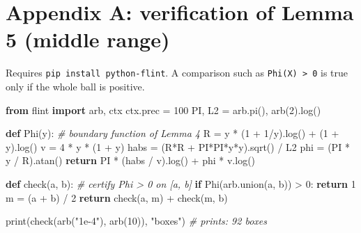 \documentclass[
  11pt,
]{article}
\newenvironment{Shaded}{}{}
\newcommand{\BuiltInTok}[1]{\textcolor[rgb]{0.00,0.50,0.00}{#1}}
\newcommand{\CommentTok}[1]{\textcolor[rgb]{0.38,0.63,0.69}{\textit{#1}}}
\newcommand{\ControlFlowTok}[1]{\textcolor[rgb]{0.00,0.44,0.13}{\textbf{#1}}}
\newcommand{\DecValTok}[1]{\textcolor[rgb]{0.25,0.63,0.44}{#1}}
\newcommand{\ImportTok}[1]{\textcolor[rgb]{0.00,0.50,0.00}{\textbf{#1}}}
\newcommand{\KeywordTok}[1]{\textcolor[rgb]{0.00,0.44,0.13}{\textbf{#1}}}
\newcommand{\NormalTok}[1]{#1}
\newcommand{\OperatorTok}[1]{\textcolor[rgb]{0.40,0.40,0.40}{#1}}
\newcommand{\StringTok}[1]{\textcolor[rgb]{0.25,0.44,0.63}{#1}}
\begin{document}
\hypertarget{appendix-a-verification-of-lemma-5-middle-range}{%
\section*{Appendix A: verification of Lemma 5 (middle
range)}\label{appendix-a-verification-of-lemma-5-middle-range}}

Requires \texttt{pip\ install\ python-flint}. A comparison such as
\texttt{Phi(X)\ \textgreater{}\ 0} is true only if the whole ball is
positive.

\begin{Shaded}
\begin{Highlighting}[]
\ImportTok{from}\NormalTok{ flint }\ImportTok{import}\NormalTok{ arb, ctx}
\NormalTok{ctx.prec }\OperatorTok{=} \DecValTok{100}
\NormalTok{PI, L2 }\OperatorTok{=}\NormalTok{ arb.pi(), arb(}\DecValTok{2}\NormalTok{).log()}

\KeywordTok{def}\NormalTok{ Phi(y):                     }\CommentTok{\# boundary function of Lemma 4}
\NormalTok{    R }\OperatorTok{=}\NormalTok{ y }\OperatorTok{*}\NormalTok{ (}\DecValTok{1} \OperatorTok{+} \DecValTok{1}\OperatorTok{/}\NormalTok{y).log() }\OperatorTok{+}\NormalTok{ (}\DecValTok{1} \OperatorTok{+}\NormalTok{ y).log()}
\NormalTok{    v }\OperatorTok{=} \DecValTok{4} \OperatorTok{*}\NormalTok{ y }\OperatorTok{*}\NormalTok{ (}\DecValTok{1} \OperatorTok{+}\NormalTok{ y)}
\NormalTok{    habs }\OperatorTok{=}\NormalTok{ (R}\OperatorTok{*}\NormalTok{R }\OperatorTok{+}\NormalTok{ PI}\OperatorTok{*}\NormalTok{PI}\OperatorTok{*}\NormalTok{y}\OperatorTok{*}\NormalTok{y).sqrt() }\OperatorTok{/}\NormalTok{ L2}
\NormalTok{    phi }\OperatorTok{=}\NormalTok{ (PI }\OperatorTok{*}\NormalTok{ y }\OperatorTok{/}\NormalTok{ R).atan()}
    \ControlFlowTok{return}\NormalTok{ PI }\OperatorTok{*}\NormalTok{ (habs }\OperatorTok{/}\NormalTok{ v).log() }\OperatorTok{+}\NormalTok{ phi }\OperatorTok{*}\NormalTok{ v.log()}

\KeywordTok{def}\NormalTok{ check(a, b):                }\CommentTok{\# certify Phi \textgreater{} 0 on [a, b]}
    \ControlFlowTok{if}\NormalTok{ Phi(arb.union(a, b)) }\OperatorTok{\textgreater{}} \DecValTok{0}\NormalTok{:}
        \ControlFlowTok{return} \DecValTok{1}
\NormalTok{    m }\OperatorTok{=}\NormalTok{ (a }\OperatorTok{+}\NormalTok{ b) }\OperatorTok{/} \DecValTok{2}
    \ControlFlowTok{return}\NormalTok{ check(a, m) }\OperatorTok{+}\NormalTok{ check(m, b)}

\BuiltInTok{print}\NormalTok{(check(arb(}\StringTok{"1e{-}4"}\NormalTok{), arb(}\DecValTok{10}\NormalTok{)), }\StringTok{"boxes"}\NormalTok{)    }\CommentTok{\# prints: 92 boxes}
\end{Highlighting}
\end{Shaded}
\end{document}
